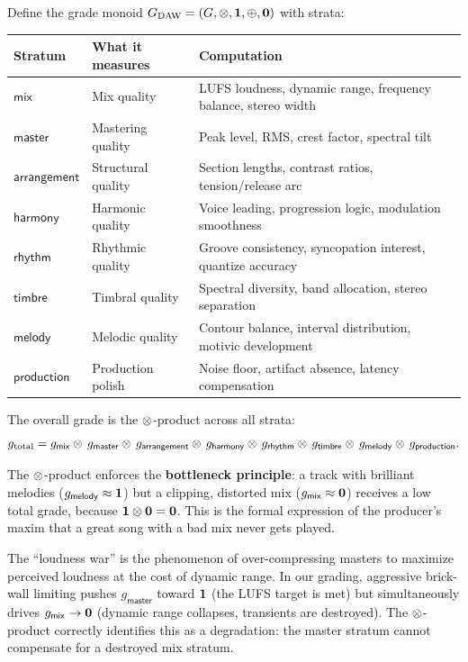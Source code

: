 \begin{definition}
\label{def:musical-grade}
Define the grade monoid
$G_{\mathrm{DAW}} = (G, \otimes, \mathbf{1}, \oplus, \mathbf{0})$ with strata:
\begin{center}
\renewcommand{\arraystretch}{1.2}
\begin{tabular}{@{}lll@{}}
\textbf{Stratum} & \textbf{What it measures} &
  \textbf{Computation} \\
\hline
$\mathsf{mix}$         & Mix quality
  & LUFS loudness, dynamic range, frequency balance, stereo width \\
$\mathsf{master}$      & Mastering quality
  & Peak level, RMS, crest factor, spectral tilt \\
$\mathsf{arrangement}$ & Structural quality
  & Section lengths, contrast ratios, tension/release arc \\
$\mathsf{harmony}$     & Harmonic quality
  & Voice leading, progression logic, modulation smoothness \\
$\mathsf{rhythm}$      & Rhythmic quality
  & Groove consistency, syncopation interest, quantize accuracy \\
$\mathsf{timbre}$      & Timbral quality
  & Spectral diversity, band allocation, stereo separation \\
$\mathsf{melody}$      & Melodic quality
  & Contour balance, interval distribution, motivic development \\
$\mathsf{production}$  & Production polish
  & Noise floor, artifact absence, latency compensation \\
\end{tabular}
\end{center}
The overall grade is the $\otimes$-product across all strata:
\[
  g_{\mathrm{total}} = g_{\mathsf{mix}} \otimes\, g_{\mathsf{master}}
    \otimes\, g_{\mathsf{arrangement}} \otimes\, g_{\mathsf{harmony}}
    \otimes\, g_{\mathsf{rhythm}} \otimes\, g_{\mathsf{timbre}}
    \otimes\, g_{\mathsf{melody}} \otimes\, g_{\mathsf{production}}.
\]
\end{definition}

The $\otimes$-product enforces the \textbf{bottleneck principle}: a
track with brilliant melodies ($g_{\mathsf{melody}} \approx
\mathbf{1}$) but a clipping, distorted mix ($g_{\mathsf{mix}} \approx
\mathbf{0}$) receives a low total grade, because $\mathbf{1} \otimes \mathbf{0}
= \mathbf{0}$.  This is the formal expression of the producer's maxim
that a great song with a bad mix never gets played.

\begin{example}
The ``loudness war'' is the phenomenon of over-compressing masters
to maximize perceived loudness at the cost of dynamic range.  In
our grading, aggressive brick-wall limiting pushes
$g_{\mathsf{master}}$ toward $\mathbf{1}$ (the LUFS target is met) but
simultaneously drives $g_{\mathsf{mix}} \to \mathbf{0}$ (dynamic range
collapses, transients are destroyed).  The $\otimes$-product correctly
identifies this as a degradation: the master stratum cannot
compensate for a destroyed mix stratum.
\end{example}

